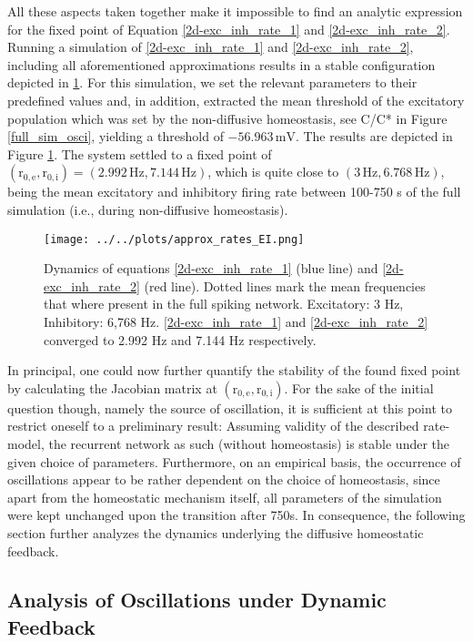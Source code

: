 \documentclass[10pt,a4paper]{article}
\begin{document}
All these aspects taken together make it impossible to find an analytic expression for the fixed point of Equation \ref{2d-exc_inh_rate_1} and \ref{2d-exc_inh_rate_2}. Running a simulation of \ref{2d-exc_inh_rate_1} and \ref{2d-exc_inh_rate_2}, including all aforementioned approximations results in a stable configuration depicted in \ref{Dyn_Rate_Approx}. For this simulation, we set the relevant parameters to their predefined values and, in addition, extracted the mean threshold of the excitatory population which was set by the non-diffusive homeostasis, see C/C* in Figure \ref{full_sim_osci}, yielding a threshold of $\mathrm{-56.963\, mV}$. The results are depicted in Figure \ref{Dyn_Rate_Approx}. The system settled to a fixed point of $\mathrm{(r_{0,e},r_{0,i}) = (2.992\, Hz, 7.144\, Hz)}$, which is quite close to $\mathrm{(3\, Hz, 6.768\, Hz)}$, being the mean excitatory and inhibitory firing rate between 100-750 s of the full simulation (i.e., during non-diffusive homeostasis).
\begin{figure}
\begin{center}
\texttt{[image: ../../plots/approx\_rates\_EI.png]}
\end{center}
\caption{Dynamics of equations \ref{2d-exc_inh_rate_1} (blue line) and \ref{2d-exc_inh_rate_2} (red line). Dotted lines mark the mean frequencies that where present in the full spiking network. Excitatory: 3 Hz, Inhibitory: 6,768 Hz. \ref{2d-exc_inh_rate_1} and \ref{2d-exc_inh_rate_2} converged to 2.992 Hz and 7.144 Hz respectively.}
\label{Dyn_Rate_Approx}
\end{figure}
In principal, one could now further quantify the stability of the found fixed point by calculating the Jacobian matrix at $\mathrm{(r_{0,e},r_{0,i})}$. For the sake of the initial question though, namely the source of oscillation, it is sufficient at this point to restrict oneself to a preliminary result: Assuming validity of the described rate-model, the recurrent network as such (without homeostasis) is stable under the given choice of parameters. Furthermore, on an empirical basis, the occurrence of oscillations appear to be rather dependent on the choice of homeostasis, since apart from the homeostatic mechanism itself, all parameters of the simulation were kept unchanged upon the transition after 750s. In consequence, the following section further analyzes the dynamics underlying the diffusive homeostatic feedback.

\subsection{Analysis of Oscillations under Dynamic Feedback}\label{theor_osc}
\end{document}
